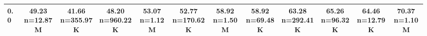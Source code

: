 \begin{table}
\begin{tabular}{lccccccccccc}
0.0 & \makecell{49.23 \\ \scriptsize n=12.87M} & \makecell{41.66 \\ \scriptsize n=355.97K} & \makecell{48.20 \\ \scriptsize n=960.22K} & \makecell{53.07 \\ \scriptsize n=1.12M} & \makecell{52.77 \\ \scriptsize n=170.62K} & \makecell{58.92 \\ \scriptsize n=1.50M} & \makecell{58.92 \\ \scriptsize n=69.48K} & \makecell{63.28 \\ \scriptsize n=292.41K} & \makecell{65.26 \\ \scriptsize n=96.32K} & \makecell{64.46 \\ \scriptsize n=12.79K} & \makecell{70.37 \\ \scriptsize n=1.10M} \\
            \bottomrule
            \end{tabular}
            \label{tab:si-disruption-matrix-2}
            \end{table}